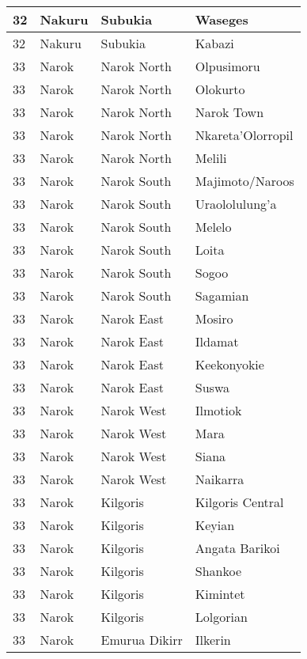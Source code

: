 \begin{table}[!ht]
\begin{tabular}{|l|l|l|l|}
        32 & Nakuru & Subukia & Waseges \\ \hline
        32 & Nakuru & Subukia & Kabazi \\ \hline
        33 & Narok & Narok North & Olpusimoru \\ \hline
        33 & Narok & Narok North & Olokurto \\ \hline
        33 & Narok & Narok North & Narok Town \\ \hline
        33 & Narok & Narok North & Nkareta’Olorropil \\ \hline
        33 & Narok & Narok North & Melili \\ \hline
        33 & Narok & Narok South & Majimoto/Naroos \\ \hline
        33 & Narok & Narok South & Uraololulung’a \\ \hline
        33 & Narok & Narok South & Melelo \\ \hline
        33 & Narok & Narok South & Loita \\ \hline
        33 & Narok & Narok South & Sogoo \\ \hline
        33 & Narok & Narok South & Sagamian \\ \hline
        33 & Narok & Narok East & Mosiro \\ \hline
        33 & Narok & Narok East & Ildamat \\ \hline
        33 & Narok & Narok East & Keekonyokie \\ \hline
        33 & Narok & Narok East & Suswa \\ \hline
        33 & Narok & Narok West & Ilmotiok \\ \hline
        33 & Narok & Narok West & Mara \\ \hline
        33 & Narok & Narok West & Siana \\ \hline
        33 & Narok & Narok West & Naikarra \\ \hline
        33 & Narok & Kilgoris & Kilgoris Central \\ \hline
        33 & Narok & Kilgoris & Keyian \\ \hline
        33 & Narok & Kilgoris & Angata Barikoi \\ \hline
        33 & Narok & Kilgoris & Shankoe \\ \hline
        33 & Narok & Kilgoris & Kimintet \\ \hline
        33 & Narok & Kilgoris & Lolgorian \\ \hline
        33 & Narok & Emurua Dikirr & Ilkerin \\ \hline

\end{tabular}
\end{table}
